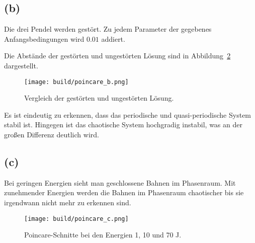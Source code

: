 \documentclass{scrartcl}
\begin{document}
\subsection*{(b)}
Die drei Pendel werden gest\"ort.
Zu jedem Parameter der gegebenes Anfangsbedingungen wird $0.01$ addiert.

Die Abst\"ande der gest\"orten und ungest\"orten L\"osung sind in Abbildung~\ref{fig:2b}
dargestellt.
\begin{figure}[ht]
  \centering
  \texttt{[image: build/poincare\_b.png]}
  \caption{Vergleich der gest\"orten und ungest\"orten L\"osung.}%
  \label{fig:2b}
\end{figure}

Es ist eindeutig zu erkennen, dass das periodische und quasi-periodische System stabil ist.
Hingegen ist das chaotische System hochgradig instabil, was an der gro{\ss}en Differenz deutlich
wird.

\subsection*{(c)}
Bei geringen Energien sieht man geschlossene Bahnen im Phasenraum. 
Mit zunehmender Energien werden die Bahnen im Phasenraum chaotischer bis sie
irgendwann nicht mehr zu erkennen sind.
\begin{figure}[ht]
  \centering
  \texttt{[image: build/poincare\_c.png]}
  \caption{Poincare-Schnitte bei den Energien 1, 10 und 70 J.}%
  \label{fig:2b}
\end{figure}
\end{document}
